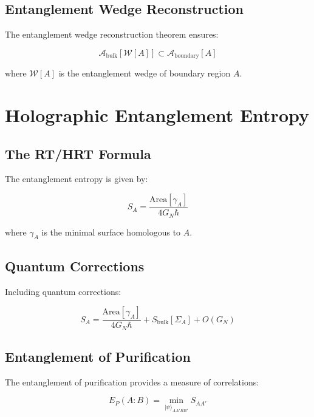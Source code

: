 \documentclass[12pt,a4paper]{article}
\begin{document}
\subsection{Entanglement Wedge Reconstruction}

The entanglement wedge reconstruction theorem ensures:

\begin{equation}
\mathcal{A}_{\text{bulk}}[\mathcal{W}[A]] \subset \mathcal{A}_{\text{boundary}}[A]
\end{equation}

where $\mathcal{W}[A]$ is the entanglement wedge of boundary region $A$.

\section{Holographic Entanglement Entropy}

\subsection{The RT/HRT Formula}

The entanglement entropy is given by:

\begin{equation}
S_A = \frac{\text{Area}[\gamma_A]}{4G_N\hbar}
\end{equation}

where $\gamma_A$ is the minimal surface homologous to $A$.

\subsection{Quantum Corrections}

Including quantum corrections:

\begin{equation}
S_A = \frac{\text{Area}[\gamma_A]}{4G_N\hbar} + S_{\text{bulk}}[\Sigma_A] + O(G_N)
\end{equation}

\subsection{Entanglement of Purification}

The entanglement of purification provides a measure of correlations:

\begin{equation}
E_P(A:B) = \min_{|\psi\rangle_{AA'BB'}} S_{AA'}
\end{equation}
\end{document}
